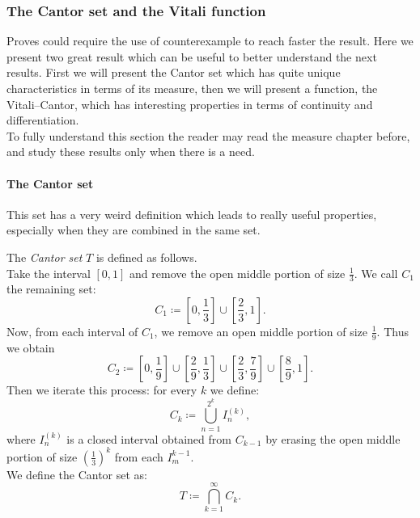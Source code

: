 \subsubsection{The Cantor set and the Vitali function}
Proves could require the use of counterexample to reach faster the result. Here we present two great result which can be useful to better understand the next results. First we will present the Cantor set which has quite unique characteristics in terms of its measure, then we will present a function, the Vitali--Cantor, which has interesting properties in terms of continuity and differentiation.\\
To fully understand this section the reader may read the measure chapter before, and study these results only when there is a need.

\paragraph{The Cantor set} This set has a very weird definition which leads to really useful properties, especially when they are combined in the same set. 

\begin{defn}\label{Cantor-set}
	The \emph{Cantor set} $T$ is defined as follows.\\
	Take the interval $[0, 1]$ and remove the open middle portion of size $\frac 1 3$. We call $C_1$ the remaining set: 
	$$C_1 
	\coloneqq \left[0, \frac 1 3\right] \cup \left[\frac 2 3, 1\right]
	.
	$$
	Now, from each interval of $C_1$, we remove an open middle portion of size $\frac 1 9$. Thus we obtain 
	$$
	C_2 
	\coloneqq \left[0, \frac 1 9\right] \cup \left[\frac 2 9, \frac 1 3\right] \cup \left[\frac 2 3, \frac 7 9\right] \cup \left[\frac 8 9, 1\right]
	.
	$$
	Then we iterate this process: for every $k$ we define: 
	$$
	C_k 
	\coloneqq \bigcup_{n=1}^{2^k} I_n^{(k)}
	,
	$$ where $I_n^{(k)}$ is a closed interval obtained from $C_{k-1}$ by erasing the open middle portion of size $\left( \frac 1 3 \right)^k$ from each $I_m^{k-1}$.\\
	We define the Cantor set as:
	$$
	T 
	\coloneqq \bigcap_{k=1}^\infty C_k
	.
	$$
\end{defn}

